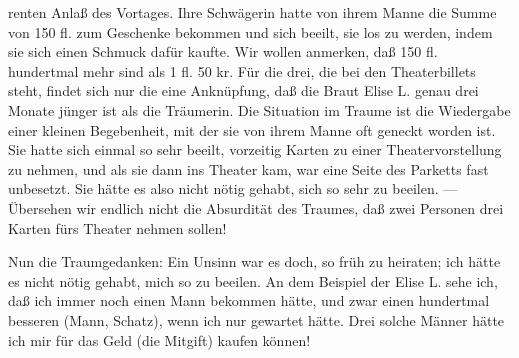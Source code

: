 \documentclass[twoside=true,titlepage=false,open=any, parskip=never, fontsize=10pt, headings=small, chapterprefix=false, appendixprefix=false]{scrbook}
\begin{document}
        \pstart
        renten Anlaß des Vortages. Ihre Schwägerin hatte von ihrem Manne die
               Summe von 150 fl. zum Geschenke bekommen und sich beeilt, sie los zu werden, indem sie sich einen Schmuck dafür kaufte.
               Wir wollen anmerken, daß 150 fl. hundertmal mehr sind als 1 fl. 50 kr. Für die
                  drei, die bei den Theaterbillets steht,
               findet sich nur die eine Anknüpfung, daß die Braut Elise L. genau drei Monate jünger ist als die Träumerin. Die Situation im Traume ist die Wiedergabe einer kleinen Begebenheit, mit
               der sie von ihrem Manne oft geneckt worden ist. Sie hatte sich einmal so sehr
                  beeilt, vorzeitig Karten zu einer Theatervorstellung zu nehmen, und als sie dann ins Theater kam, war eine Seite des Parketts fast unbesetzt. Sie hätte
               es also nicht nötig gehabt, sich so sehr zu
                  beeilen. — Übersehen wir endlich nicht die Absurdität des Traumes, daß zwei Personen drei
               Karten fürs Theater nehmen sollen!
        \pend
    
            
        \pstart
        Nun die Traumgedanken: Ein Unsinn war es doch, so
               früh zu heiraten; ich hätte es nicht nötig gehabt,
                  mich so zu beeilen. An dem Beispiel der Elise L. sehe ich, daß ich immer
               noch einen Mann bekommen hätte, und zwar einen hundertmal besseren (Mann,
               Schatz), wenn ich nur gewartet hätte.
               Drei solche Männer hätte ich mir für das Geld (die
               Mitgift) kaufen können!
        \pend
    
         
            
            
            \pend
            
\end{document}

